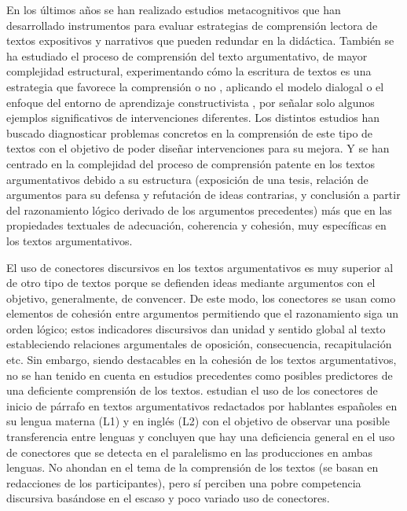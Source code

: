 \documentclass[spanish]{textolivre}
\begin{document}
En los últimos años se han realizado estudios metacognitivos que han desarrollado instrumentos para evaluar estrategias de comprensión lectora de textos expositivos \cite{lopez-escribano_predictive_2013, madariagaorbea2010teaching, soriano-ferrer_instruccion_2013} y narrativos \cite{larranaga_evaluacion_2015} que pueden redundar en la didáctica. También se ha estudiado el proceso de comprensión del texto argumentativo, de mayor complejidad estructural, experimentando cómo la escritura de textos es una estrategia que favorece la comprensión \cite{dolz_writing_1995} o no \cite{garate_written_2007}, aplicando el modelo dialogal \cite{alvarez_dificultades_2017} o el enfoque del entorno de aprendizaje constructivista \cite{muhlen_how_2019}, por señalar solo algunos ejemplos significativos de intervenciones diferentes. Los distintos estudios han buscado diagnosticar problemas concretos en la comprensión de este tipo de textos con el objetivo de poder diseñar intervenciones para su mejora. Y se han centrado en la complejidad del proceso de comprensión patente en los textos argumentativos debido a su estructura (exposición de una tesis, relación de argumentos para su defensa y refutación de ideas contrarias, y conclusión a partir del razonamiento lógico derivado de los argumentos precedentes) más que en las propiedades textuales de adecuación, coherencia y cohesión, muy específicas en los textos argumentativos.

El uso de conectores discursivos en los textos argumentativos es muy superior al de otro tipo de textos porque se defienden ideas mediante argumentos con el objetivo, generalmente, de convencer. De este modo, los conectores se usan como elementos de cohesión entre argumentos permitiendo que el razonamiento siga un orden lógico; estos indicadores discursivos dan unidad y sentido global al texto estableciendo relaciones argumentales de oposición, consecuencia, recapitulación etc. Sin embargo, siendo destacables en la cohesión de los textos argumentativos, no se han tenido en cuenta en estudios precedentes como posibles predictores de una deficiente comprensión de los textos. \textcite{martin-macho-harrison_uso_2022} estudian el uso de los conectores de inicio de párrafo en textos argumentativos redactados por hablantes españoles en su lengua materna (L1) y en inglés (L2) con el objetivo de observar una posible transferencia entre lenguas y concluyen que hay una deficiencia general en el uso de conectores que se detecta en el paralelismo en las producciones en ambas lenguas. No ahondan en el tema de la comprensión de los textos (se basan en redacciones de los participantes), pero sí perciben una pobre competencia discursiva basándose en el escaso y poco variado uso de conectores.
\end{document}
